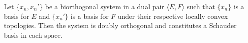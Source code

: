 Let $\{x_n, x_n'\}$ be a biorthogonal system in a dual pair $\langle E, F \rangle$ such that $\{x_n\}$ is a basis for $E$ and $\{x_n'\}$ is a basis for $F$ under their respective locally convex topologies. Then the system is doubly orthogonal and constitutes a Schauder basis in each space.

